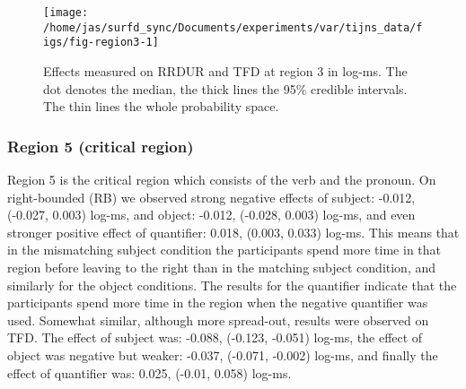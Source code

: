 \begin{knitrout}
\color{fgcolor}\begin{figure}
\texttt{[image: /home/jas/surfd\_sync/Documents/experiments/var/tijns\_data/figs/fig-region3-1]} \caption{\label{fig:summary-region3}Effects measured on RRDUR and TFD at region 3 in log-ms. The dot denotes the median, the thick lines the 95\% credible intervals. The thin lines the whole probability space.}\label{fig:fig-region3}
\end{figure}

\end{knitrout}
%



\subsubsection{Region 5 (critical region)}

Region 5 is the critical region which consists of the verb and the pronoun. On right-bounded (RB) we observed strong negative effects of subject: -0.012, (-0.027, 0.003) log-ms, and object: -0.012, (-0.028, 0.003) log-ms, and even stronger positive effect of quantifier: 0.018, (0.003, 0.033) log-ms. This means that in the mismatching subject condition the participants spend more time in that region before leaving to the right than in the matching subject condition, and similarly for the object conditions. The results for the quantifier indicate that the participants spend more time in the region when the negative quantifier was used.
Somewhat similar, although more spread-out, results were observed on TFD. The effect of subject was: -0.088, (-0.123, -0.051) log-ms, the effect of object was negative but weaker: -0.037, (-0.071, -0.002) log-ms, and finally the effect of quantifier was: 0.025, (-0.01, 0.058) log-ms.

